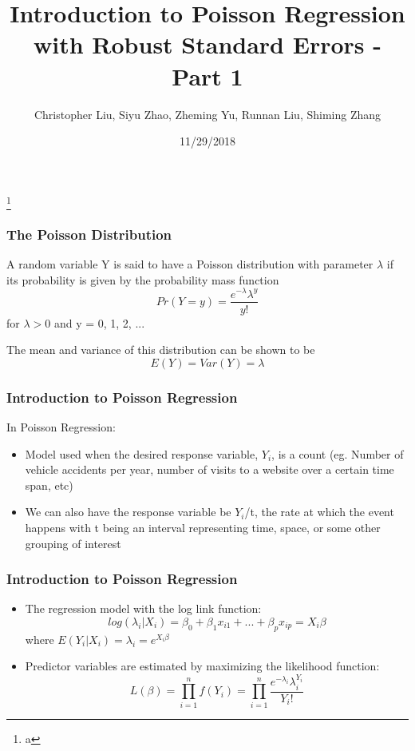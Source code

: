 \documentclass{beamer}
\title{Introduction to Poisson Regression with Robust Standard Errors - Part 1}
\author{Christopher Liu, Siyu Zhao, Zheming Yu, Runnan Liu, Shiming Zhang}
\institute{San Diego State University, Stats 610}
\date{11/29/2018}
\begin{document}
	

\begin{frame}[plain]

	\titlepage
	
	\footnote{a}

\end{frame}



\begin{frame}[fragile]\frametitle{The Poisson Distribution}

	A random variable Y is said to have a Poisson distribution with parameter $\lambda$ if its probability is given by the probability mass function
	$$ Pr(Y = y) = \frac{e^{-\lambda}\lambda^{y}}{y!} $$
	for $\lambda > 0$ and y = 0, 1, 2, ... 
 
	The mean and variance of this distribution can be shown to be
	$$ E(Y) = Var(Y) = \lambda $$ 

\end{frame}



\begin{frame}[fragile]\frametitle{Introduction to Poisson Regression}
	In Poisson Regression:
	
	\begin{itemize}
	
		\item Model used when the desired response variable, $Y_{i}$, is a count (eg. Number of vehicle accidents per year, number of visits to a website over a certain time span, etc)
		\item We can also have the response variable be $Y_{i}$/t, the rate at which the event happens with t being an interval representing time, space, or some other grouping of interest

	\end{itemize}

\end{frame}



\begin{frame}[fragile]\frametitle{Introduction to Poisson Regression}

	\begin{itemize}
		
		\item The regression model with the log link function:
 		$$ log(\lambda_i|X_i) = \beta_0 + \beta_1 x_{i1} + ... + \beta_p x_{ip} = X_i \beta $$  		
 		where $ E(Y_i|X_i) = \lambda_i = e^{X_i \beta}$

		\item Predictor variables are estimated by maximizing the likelihood function:
		$$ L(\beta) = \prod_{i=1}^{n} f(Y_i) = \prod_{i=1}^{n} \frac{ e^{-\lambda_i} \lambda_i^{Y_i} }{Y_i!} $$
		
	\end{itemize}
	
\end{frame}
\end{document}
